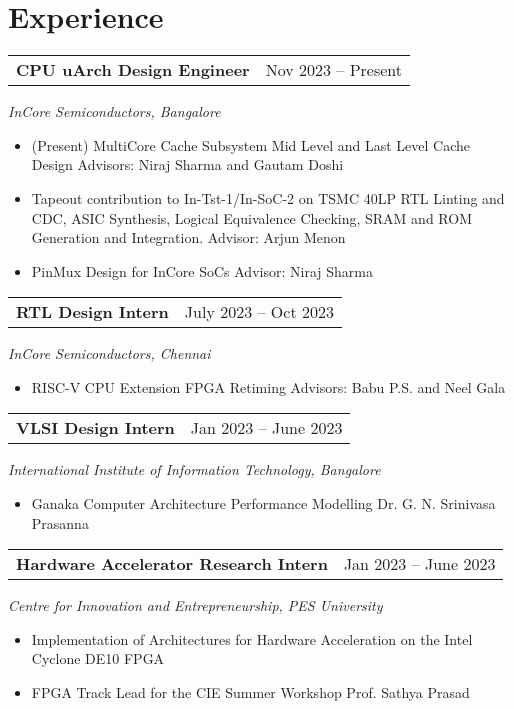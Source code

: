 \section{\sc Experience}

\begin{tabular}{@{}p{4in}p{2in}}
  {\bf{CPU uArch Design Engineer}}  & Nov 2023 – Present \\
\end{tabular}  
\textit{InCore Semiconductors, Bangalore} 
\vspace{0.4em}
\begin{itemize}
    \setlength\itemsep{0em}
    \item (Present) MultiCore Cache Subsystem Mid Level and Last Level Cache Design 
      \subitem Advisors: Niraj Sharma and Gautam Doshi
    \item Tapeout contribution to In-Tst-1/In-SoC-2 on TSMC 40LP 
      \subitem RTL Linting and CDC, ASIC Synthesis, Logical Equivalence Checking, 
      \subitem SRAM and ROM Generation and Integration.
      \subitem Advisor: Arjun Menon
    \item PinMux Design for InCore SoCs
      \subitem Advisor: Niraj Sharma 
\end{itemize}
\begin{tabular}{@{}p{4in}p{2in}}
  {\bf{RTL Design Intern}}  & July 2023 – Oct 2023 \\
\end{tabular}  
\textit{InCore Semiconductors, Chennai} 
\begin{itemize}
    \setlength\itemsep{0em}
  \item RISC-V CPU Extension FPGA Retiming
    \subitem Advisors: Babu P.S. and Neel Gala  
\end{itemize}

\begin{tabular}{@{}p{4in}p{2in}}
  {\bf{VLSI Design Intern}} & Jan 2023 – June 2023 \\
\end{tabular}
\textit{International Institute of Information Technology, Bangalore}  
\begin{itemize}
    \setlength\itemsep{0em}
  \item Ganaka Computer Architecture Performance Modelling 
    \subitem Dr. G. N. Srinivasa Prasanna 
\end{itemize}

\begin{tabular}{@{}p{4in}p{2in}}
  {\bf{Hardware Accelerator Research Intern}}  & Jan 2023 – June 2023 \\
\end{tabular}
\textit{Centre for Innovation and Entrepreneurship, PES University} 
\begin{itemize}
    \setlength\itemsep{0em}
      \item Implementation of Architectures for Hardware Acceleration on the Intel
  Cyclone DE10 FPGA
      \item FPGA Track Lead for the CIE Summer Workshop
      \subitem Prof. Sathya Prasad 
\end{itemize}

